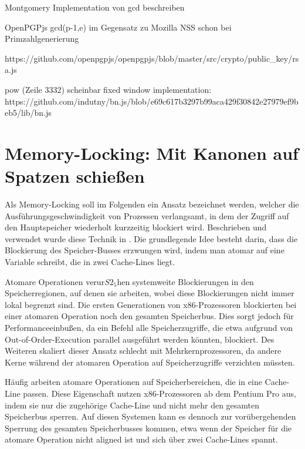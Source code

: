 Montgomery Implementation von gcd beschreiben

OpenPGPjs gcd(p-1,e) im Gegensatz zu Mozilla NSS schon bei Primzahlgenerierung

https://github.com/openpgpjs/openpgpjs/blob/master/src/crypto/public_key/rsa.js

pow (Zeile 3332) scheinbar fixed window implementation:\\
https://github.com/indutny/bn.js/blob/e69c617b3297b99aca429f30842e27979ef9beb5/lib/bn.js

\section{Memory-Locking: Mit Kanonen auf Spatzen schießen}
\label{MemoryLocking}

Als Memory-Locking soll im Folgenden ein Ansatz bezeichnet werden, welcher die Ausführungsgeschwindigkeit von Prozessen verlangsamt, in dem der Zugriff auf den Hauptspeicher wiederholt kurzzeitig blockiert wird.
Beschrieben und verwendet wurde diese Technik in \cite{MemoryLockingWu, MemoryLockingRisenpart, MemoryLockingJavaAndroid}.
Die grundlegende Idee besteht darin, dass die Blockierung des Speicher-Busses erzwungen wird, indem man atomar auf eine Variable schreibt, die in zwei Cache-Lines liegt.

Atomare Operationen verur$S2_5$hen systemweite Blockierungen in den Speicherregionen, auf denen sie arbeiten, wobei diese Blockierungen nicht immer lokal begrenzt sind.
Die ersten Generationen von x86-Prozessoren blockierten bei einer atomaren Operation noch den gesamten Speicherbus.
Dies sorgt jedoch für Performanceeinbußen, da ein Befehl alle Speicherzugriffe, die etwa aufgrund von Out-of-Order-Execution parallel ausgeführt werden könnten, blockiert.
Des Weiteren skaliert dieser Ansatz schlecht mit Mehrkernprozessoren, da andere Kerne während der atomaren Operation auf Speicherzugriffe verzichten müssten.

Häufig arbeiten atomare Operationen auf Speicherbereichen, die in eine Cache-Line passen. Diese Eigenschaft nutzen x86-Prozessoren ab dem Pentium Pro aus, indem sie nur die zugehörige Cache-Line und nicht mehr den gesamten Speicherbus sperren.
Auf diesen Systemen kann es dennoch zur vorübergehenden Sperrung des gesamten Speicherbusses kommen, etwa wenn der Speicher für die atomare Operation nicht 
aligned %
ist und sich über zwei Cache-Lines spannt.

